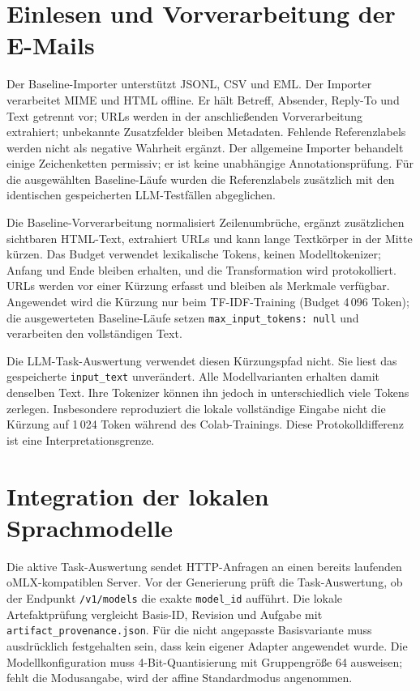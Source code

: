 \documentclass[12pt,twoside=false,a4paper,parskip]{scrbook}
\begin{document}
\section{Einlesen und Vorverarbeitung der E-Mails}\label{sec:vorverarbeitung}

Der Baseline-Importer unterstützt JSONL, CSV und EML. Der Importer verarbeitet MIME und HTML offline. Er hält Betreff, Absender, Reply-To und Text getrennt vor; URLs werden in der anschließenden Vorverarbeitung extrahiert; unbekannte Zusatzfelder bleiben Metadaten. Fehlende Referenzlabels werden nicht als negative Wahrheit ergänzt. Der allgemeine Importer behandelt einige Zeichenketten permissiv; er ist keine unabhängige Annotationsprüfung. Für die ausgewählten Baseline-Läufe wurden die Referenzlabels zusätzlich mit den identischen gespeicherten LLM-Testfällen abgeglichen.

Die Baseline-Vorverarbeitung normalisiert Zeilenumbrüche, ergänzt zusätzlichen sichtbaren HTML-Text, extrahiert URLs und kann lange Textkörper in der Mitte kürzen. Das Budget verwendet lexikalische Tokens, keinen Modelltokenizer; Anfang und Ende bleiben erhalten, und die Transformation wird protokolliert. URLs werden vor einer Kürzung erfasst und bleiben als Merkmale verfügbar. Angewendet wird die Kürzung nur beim TF-IDF-Training (Budget 4\,096 Token); die ausgewerteten Baseline-Läufe setzen \texttt{max\_input\_tokens: null} und verarbeiten den vollständigen Text.

Die LLM-Task-Auswertung verwendet diesen Kürzungspfad nicht. Sie liest das gespeicherte \texttt{input\_text} unverändert. Alle Modellvarianten erhalten damit denselben Text. Ihre Tokenizer können ihn jedoch in unterschiedlich viele Tokens zerlegen. Insbesondere reproduziert die lokale vollständige Eingabe nicht die Kürzung auf 1\,024 Token während des Colab-Trainings. Diese Protokolldifferenz ist eine Interpretationsgrenze.

\section{Integration der lokalen Sprachmodelle}\label{sec:modellintegration}

Die aktive Task-Auswertung sendet HTTP-Anfragen an einen bereits laufenden oMLX-kompatiblen Server. Vor der Generierung prüft die Task-Auswertung, ob der Endpunkt \texttt{/v1/models} die exakte \texttt{model\_id} aufführt. Die lokale Artefaktprüfung vergleicht Basis-ID, Revision und Aufgabe mit \texttt{artifact\_provenance.json}. Für die nicht angepasste Basisvariante muss ausdrücklich festgehalten sein, dass kein eigener Adapter angewendet wurde. Die Modellkonfiguration muss 4-Bit-Quantisierung mit Gruppengröße 64 ausweisen; fehlt die Modusangabe, wird der affine Standardmodus angenommen.
\end{document}
